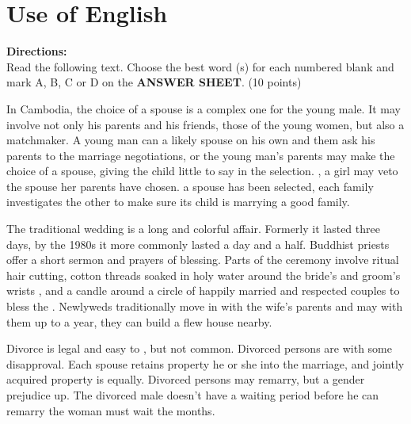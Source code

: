 


\section{Use of English}

\noindent
\textbf{ Directions:}\\
Read the following text. Choose the best word (s) for each
	numbered blank and mark A, B, C or D on the \textbf{ANSWER SHEET}. (10 points)


\TiGanSpace

In Cambodia, the choice of a spouse is a complex one for the young
male. It may involve not only his parents and his
friends, \cloze those of the young women, but also a
matchmaker. A young man can \cloze a likely spouse on his own
and them ask his parents to \cloze the marriage negotiations, or
the young man's parents may make the choice of a spouse, giving the
child little to say in the selection. \cloze , a girl may veto
the spouse her parents have chosen. \cloze a spouse has been
selected, each family investigates the other to make sure its child is
marrying \cloze a good family.

The traditional wedding is a long and colorful affair. Formerly it
lasted three days, \cloze by the 1980s it more commonly lasted a
day and a half. Buddhist priests offer a short sermon and \cloze
prayers of blessing. Parts of the ceremony involve ritual hair
cutting, \cloze cotton threads soaked in holy water around the
bride's and groom's wrists , and \cloze a candle around a circle
of happily married and respected couples to bless the \cloze
. Newlyweds traditionally move in with the wife's parents and may
\cloze with them up to a year, \cloze they can build a
flew house nearby.

Divorce is legal and easy to \cloze , but not common. Divorced
persons are \cloze with some disapproval. Each spouse retains
\cloze property he or she \cloze into the marriage, and
jointly acquired property is \cloze equally. Divorced persons
may remarry, but a gender prejudice \cloze up. The divorced
male doesn't have a waiting period before he can remarry \cloze
the woman must wait the months.


\newpage

